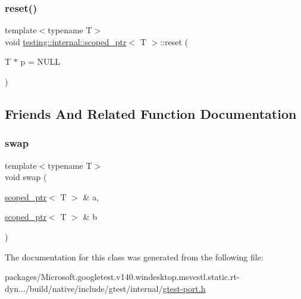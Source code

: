 \mbox{\label{classtesting_1_1internal_1_1scoped__ptr_acac03266a43359801aff0de5c990bec0}} 
\subsubsection{\texorpdfstring{reset()}{reset()}}
{\footnotesize\ttfamily template$<$typename T$>$ \\
void \mbox{\hyperlink{classtesting_1_1internal_1_1scoped__ptr}{testing\+::internal\+::scoped\+\_\+ptr}}$<$ T $>$\+::reset (\begin{DoxyParamCaption}\item[{T $\ast$}]{p = {\ttfamily NULL} }\end{DoxyParamCaption})\hspace{0.3cm}{\ttfamily [inline]}}



\subsection{Friends And Related Function Documentation}
\mbox{\label{classtesting_1_1internal_1_1scoped__ptr_a01bc0441e6a3ebf26807ac523392ca86}} 
\subsubsection{\texorpdfstring{swap}{swap}}
{\footnotesize\ttfamily template$<$typename T$>$ \\
void swap (\begin{DoxyParamCaption}\item[{\mbox{\hyperlink{classtesting_1_1internal_1_1scoped__ptr}{scoped\+\_\+ptr}}$<$ T $>$ \&}]{a,  }\item[{\mbox{\hyperlink{classtesting_1_1internal_1_1scoped__ptr}{scoped\+\_\+ptr}}$<$ T $>$ \&}]{b }\end{DoxyParamCaption})\hspace{0.3cm}{\ttfamily [friend]}}



The documentation for this class was generated from the following file\+:\begin{DoxyCompactItemize}
\item 
packages/\+Microsoft.\+googletest.\+v140.\+windesktop.\+msvcstl.\+static.\+rt-\/dyn.../build/native/include/gtest/internal/\mbox{\hyperlink{gtest-port_8h}{gtest-\/port.\+h}}\end{DoxyCompactItemize}
